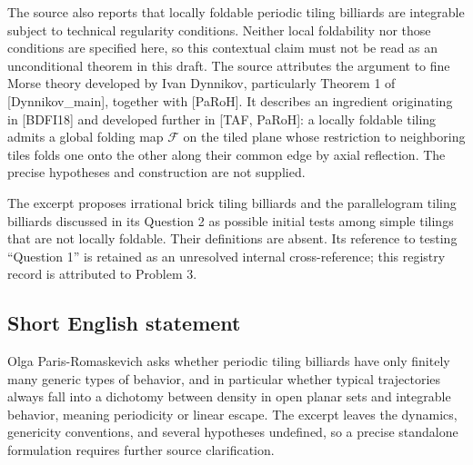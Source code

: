 \documentclass[11pt]{article}
\begin{document}
The source also reports that locally foldable periodic tiling billiards are integrable subject to technical regularity conditions. Neither local foldability nor those conditions are specified here, so this contextual claim must not be read as an unconditional theorem in this draft. The source attributes the argument to fine Morse theory developed by Ivan Dynnikov, particularly Theorem 1 of [Dynnikov\_main], together with [PaRoH]. It describes an ingredient originating in [BDFI18] and developed further in [TAF, PaRoH]: a locally foldable tiling admits a global folding map \(\mathcal F\) on the tiled plane whose restriction to neighboring tiles folds one onto the other along their common edge by axial reflection. The precise hypotheses and construction are not supplied.

The excerpt proposes irrational brick tiling billiards and the parallelogram tiling billiards discussed in its Question 2 as possible initial tests among simple tilings that are not locally foldable. Their definitions are absent. Its reference to testing ``Question 1'' is retained as an unresolved internal cross-reference; this registry record is attributed to Problem 3.
\subsection{Short English statement}
Olga Paris-Romaskevich asks whether periodic tiling billiards have only finitely many generic types of behavior, and in particular whether typical trajectories always fall into a dichotomy between density in open planar sets and integrable behavior, meaning periodicity or linear escape. The excerpt leaves the dynamics, genericity conventions, and several hypotheses undefined, so a precise standalone formulation requires further source clarification.
\end{document}
